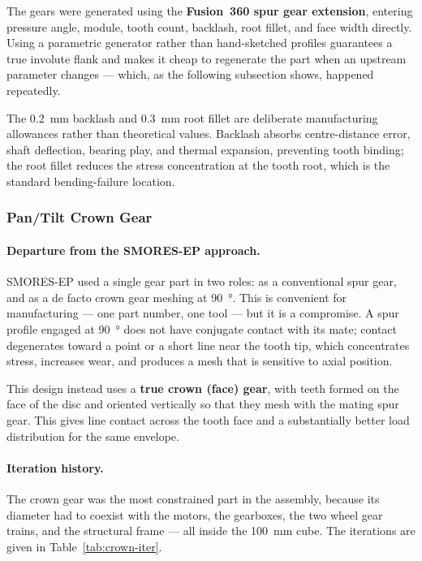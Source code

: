 \documentclass[12pt,a4paper]{article}
\begin{document}
The gears were generated using the \textbf{Fusion~360 spur gear extension},
entering pressure angle, module, tooth count, backlash, root fillet, and face
width directly. Using a parametric generator rather than hand-sketched profiles
guarantees a true involute flank and makes it cheap to regenerate the part when
an upstream parameter changes --- which, as the following subsection shows,
happened repeatedly.

The \SI{0.2}{\milli\metre} backlash and \SI{0.3}{\milli\metre} root fillet are
deliberate manufacturing allowances rather than theoretical values. Backlash
absorbs centre-distance error, shaft deflection, bearing play, and thermal
expansion, preventing tooth binding; the root fillet reduces the stress
concentration at the tooth root, which is the standard bending-failure
location.

\subsubsection{Pan/Tilt Crown Gear}

\paragraph{Departure from the SMORES-EP approach.}
SMORES-EP used a single gear part in two roles: as a conventional spur gear,
and as a de facto crown gear meshing at \SI{90}{\degree}. This is convenient for
manufacturing --- one part number, one tool --- but it is a compromise. A spur
profile engaged at \SI{90}{\degree} does not have conjugate contact with its
mate; contact degenerates toward a point or a short line near the tooth tip,
which concentrates stress, increases wear, and produces a mesh that is
sensitive to axial position.

This design instead uses a \textbf{true crown (face) gear}, with teeth formed on
the face of the disc and oriented vertically so that they mesh with the mating
spur gear. This gives line contact across the tooth face and a substantially
better load distribution for the same envelope.

\paragraph{Iteration history.}
The crown gear was the most constrained part in the assembly, because its
diameter had to coexist with the motors, the gearboxes, the two wheel gear
trains, and the structural frame --- all inside the \SI{100}{\milli\metre} cube.
The iterations are given in Table~\ref{tab:crown-iter}.
\end{document}
